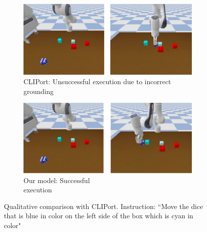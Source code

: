 \begin{figure}
    \centering
    \hfill
    \begin{subfigure}{0.45\textwidth}
        \centering
        \includegraphics[width=\textwidth]{assets/cliport-qual.png}
        \caption{CLIPort: Unsuccessful execution due to incorrect grounding}
    \end{subfigure}
    \hfill
    \begin{subfigure}{0.45\textwidth}
        \centering
        \includegraphics[width=\textwidth]{assets/cliport-qual-ours.png}
        \caption{Our model: Successful \\ execution}
    \end{subfigure}
    \hfill

    \caption{Qualitative comparison with CLIPort. Instruction: “Move the dice that is blue in color on the left side of the box which is cyan in color"}
    \label{fig:cliport-qual}
\end{figure}

